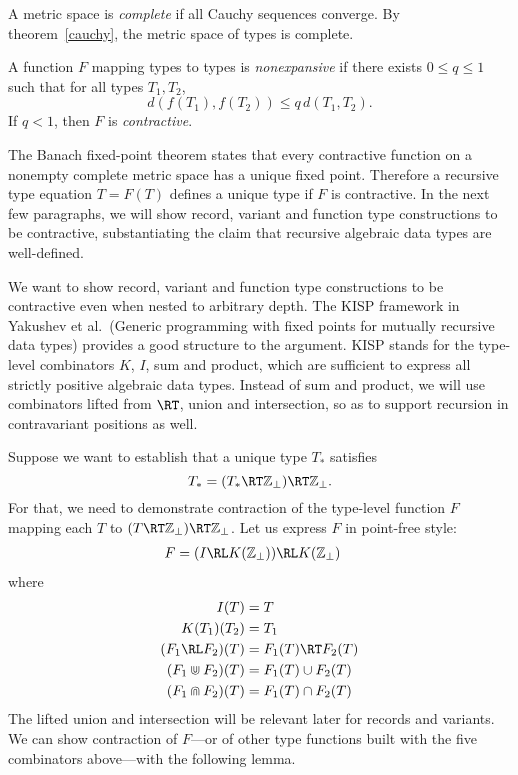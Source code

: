 \documentclass{amsart}
\theoremstyle{definition}
\begin{document}

A metric space is \emph{complete} if all Cauchy sequences
converge. By theorem~\ref{cauchy}, the metric space of types is
complete.

A function $F$ mapping types to types is \emph{nonexpansive} if
there exists $0\le q\le1$ such that for all types $T_1,T_2$,
\[
d(f(T_1), f(T_2)) \le q \, d(T_1, T_2).
\]
If $q<1$, then $F$ is \emph{contractive}.

The Banach fixed-point theorem states that every contractive
function on a nonempty complete metric space has a unique fixed
point. Therefore a recursive type equation $T=F(T)$ defines a
unique type if $F$ is contractive. In the next few paragraphs, we
will show record, variant and function type constructions to be
contractive, substantiating the claim that recursive algebraic
data types are well-defined.

\label{kisp}

We want to show record, variant and function type constructions
to be contractive even when nested to arbitrary depth. The KISP
framework in Yakushev et al.\ (Generic programming with fixed
points for mutually recursive data types) provides a good
structure to the argument. KISP stands for the type-level
combinators $K$, $I$, sum and product, which are sufficient to
express all strictly positive algebraic data types. Instead of
sum and product, we will use combinators lifted from $\RT$, union
and intersection, so as to support recursion in contravariant
positions as well.

Suppose we want to establish that a unique type $T_*$
satisfies
\[
T_*=(T_*\RT \mathbb Z_\bot)\RT \mathbb Z_\bot.
\]
For that, we need to demonstrate contraction of the type-level
function $F$ mapping each $T$ to $(T \RT \mathbb Z_\bot)\RT
\mathbb Z_\bot$. Let us express $F$ in point-free style:
\begin{align*}
F &= (I \RL K(\mathbb Z_\bot)) \RL K(\mathbb Z_\bot)
\end{align*}
where
\begin{align*}
I(T) &= T \\
K(T_1)(T_2) &= T_1 \\
(F_1 \RL F_2)(T) &= F_1(T) \RT F_2(T)\\
(F_1 \Cup F_2)(T) &= F_1(T) \cup F_2(T)\\
(F_1 \Cap F_2)(T) &= F_1(T) \cap F_2(T)
\end{align*}
The lifted union and intersection will be relevant later for
records and variants. We can show contraction of $F$---or of
other type functions built with the five combinators above---with
the following lemma.
\end{document}
